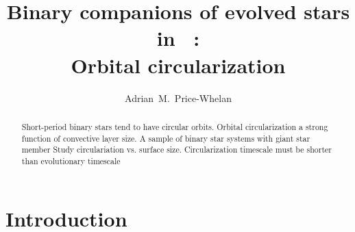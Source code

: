 \documentclass[modern, letterpaper]{aastex62}
\newcommand{\apogee}{\project{\acronym{APOGEE}}}
\newcommand{\DR}{\acronym{DR14}}
\begin{document}
\sloppy\sloppypar\raggedbottom\frenchspacing %

\title{Binary companions of evolved stars in \apogee\ \DR: \\
       Orbital circularization}

\author[0000-0003-0872-7098]{Adrian~M.~Price-Whelan}



\begin{abstract}\noindent %
Short-period binary stars tend to have circular orbits.
Orbital circularization a strong function of convective layer size.
A sample of binary star systems with giant star member
Study circulariation vs. surface size.
Circularization timescale must be shorter than evolutionary timescale
\end{abstract}


\section{Introduction} \label{sec:intro}
\end{document}
